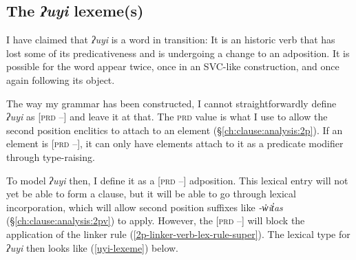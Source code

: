 \subsection{The \textit{ʔuyi} lexeme(s)} \label{ch:link:analysis:uyi}

I have claimed that \textit{ʔuyi} is a word in transition: It is an historic verb that has lost some of its predicativeness and is undergoing a change to an adposition. It is possible for the word appear twice, once in an SVC-like construction, and once again following its object.

The way my grammar has been constructed, I cannot straightforwardly define \textit{ʔuyi} as [\textsc{prd} --] and leave it at that. The \textsc{prd} value is what I use to allow the second position enclitics to attach to an element (\S\ref{ch:clause:analysis:2p}). If an element is [\textsc{prd} --], it can only have elements attach to it as a predicate modifier through type-raising.

To model \textit{ʔuyi} then, I define it as a [\textsc{prd} --] adposition. This lexical entry will not yet be able to form a clause, but it will be able to go through lexical incorporation, which will allow second position suffixes like \textit{-w̓it̓as} (\S\ref{ch:clause:analysis:2pv}) to apply. However, the [\textsc{prd} --] will block the application of the linker rule (\ref{2p-linker-verb-lex-rule-super}). The lexical type for \textit{ʔuyi} then looks like (\ref{uyi-lexeme}) below.

\ex \label{uyi-lexeme}
\xe

